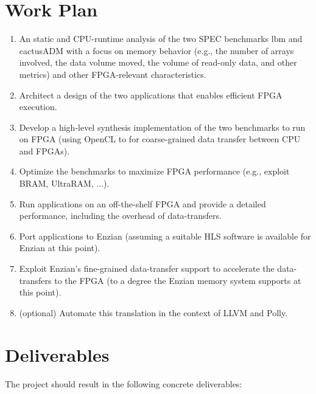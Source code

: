\documentclass[10pt]{article}
\begin{document}
\section*{Work Plan}

\begin{enumerate}
	\item An static and CPU-runtime analysis of the
two SPEC benchmarks lbm and cactusADM with a focus on memory behavior (e.g.,
the number of arrays involved, the data volume moved, the volume of read-only
data, and other metrics) and other FPGA-relevant characteristics.

	\item Architect a design of the two applications that enables efficient
	      FPGA execution.

	\item Develop a high-level synthesis implementation of the two
	      benchmarks to run on FPGA (using OpenCL to for coarse-grained
	      data transfer between CPU and FPGAs).

	\item Optimize the benchmarks to maximize FPGA performance (e.g.,
	      exploit BRAM, UltraRAM, ...).

	\item Run applications on an off-the-shelf FPGA and provide a
	      detailed performance, including the overhead of data-transfers.

	\item Port applications to Enzian (assuming a suitable HLS software
	      is available for Enzian at this point).

	\item Exploit Enzian's fine-grained data-transfer support to
	      accelerate the data-transfers to the FPGA (to a degree the
	      Enzian memory system supports at this point).

	\item (optional) Automate this translation in the context of
	      LLVM and Polly.

\end{enumerate}

\section*{Deliverables}

The project should result in the following concrete deliverables:
\end{document}
